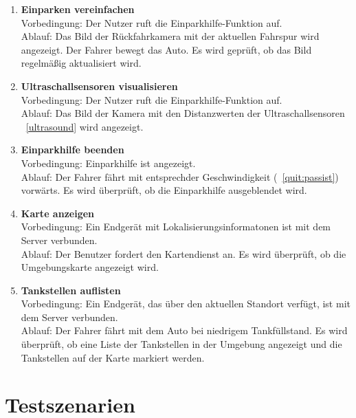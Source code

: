 \documentclass[pflichtenheft.tex]{subfiles}
\begin{document}
\begin{enumerate}
\item{\textbf{Einparken vereinfachen}} \label{parkenT} \\
Vorbedingung: Der Nutzer ruft die Einparkhilfe-Funktion auf. \\
Ablauf: Das Bild der Rückfahrkamera mit der aktuellen Fahrspur wird angezeigt. Der Fahrer bewegt das Auto. Es wird geprüft, ob das Bild regelmäßig aktualisiert wird.

\item{\textbf{Ultraschallsensoren visualisieren}} \label{ultraT} \\
Vorbedingung: Der Nutzer ruft die Einparkhilfe-Funktion auf. \\
Ablauf: Das Bild der Kamera mit den Distanzwerten der Ultraschallsensoren ~\ref{ultrasound} wird angezeigt.

\item{\textbf{Einparkhilfe beenden}} \label{endParkenT} \\
Vorbedingung: Einparkhilfe ist angezeigt. \\
Ablauf: Der Fahrer fährt mit entsprechder Geschwindigkeit (~\ref{quit:passist}) vorwärts. Es wird überprüft, ob die Einparkhilfe ausgeblendet wird.

\item{\textbf{Karte anzeigen}} \label{showMapT} \\ 
Vorbedingung: Ein Endgerät mit Lokalisierungsinformatonen ist mit dem
Server verbunden.\\
Ablauf: Der Benutzer fordert den Kartendienst an. Es wird überprüft, ob die Umgebungskarte angezeigt wird.

\item{\textbf{Tankstellen auflisten}} \label{showFuelT} \\
Vorbedingung: Ein Endgerät, das über den aktuellen Standort verfügt, ist mit dem Server verbunden.\\
Ablauf: Der Fahrer fährt mit dem Auto bei niedrigem Tankfüllstand. Es wird überprüft, ob eine Liste der Tankstellen in der Umgebung angezeigt und die Tankstellen auf der Karte markiert werden. 

\end{enumerate}

\chapter{Testszenarien}

\renewcommand{\theenumi}{\ifnum \value{enumi}<10 0\fi\arabic{enumi}}
\renewcommand{\labelenumi}{\theenumi}
\renewcommand{\theenumii}{\arabic{enumii}}
\renewcommand{\labelenumii}{\ifnum \value{enumi}<10 0\fi\arabic{enumi}\arabic{enumii}}
\end{document}
